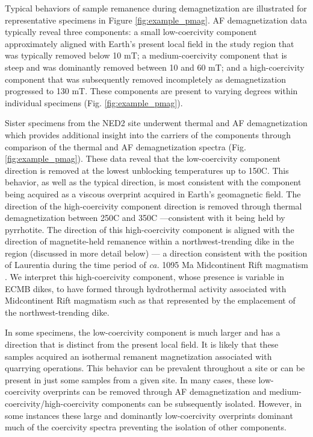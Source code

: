 \documentclass[draft]{agujournal2019}
\begin{document}
Typical behaviors of sample remanence during demagnetization are illustrated for representative specimens in Figure \ref{fig:example_pmag}. AF demagnetization data typically reveal three components: a small low-coercivity component approximately aligned with Earth's present local field in the study region that was typically removed below 10 mT; a medium-coercivity component that is steep and was dominantly removed between 10 and 60 mT; and a high-coercivity component that was subsequently removed incompletely as demagnetization progressed to 130 mT. These components are present to varying degrees within individual specimens (Fig. \ref{fig:example_pmag}).

Sister specimens from the NED2 site underwent thermal and AF demagnetization which provides additional insight into the carriers of the components through comparison of the thermal and AF demagnetization spectra (Fig. \ref{fig:example_pmag}). These data reveal that the low-coercivity component direction is removed at the lowest unblocking temperatures up to 150\textdegree C. This behavior, as well as the typical direction, is most consistent with the component being acquired as a viscous overprint acquired in Earth's geomagnetic field. The direction of the high-coercivity component direction is removed through thermal demagnetization between 250\textdegree C and 350\textdegree C ---consistent with it being held by pyrrhotite. The direction of this high-coercivity component is aligned with the direction of magnetite-held remanence within a northwest-trending dike in the region (discussed in more detail below) --- a direction consistent with the position of Laurentia during the time period of \textit{ca.} 1095 Ma Midcontinent Rift magmatism \cite{Swanson-Hysell2020a}. We interpret this high-coercivity component, whose presence is variable in ECMB dikes, to have formed through hydrothermal activity associated with Midcontinent Rift magmatism such as that represented by the emplacement of the northwest-trending dike.  

In some specimens, the low-coercivity component is much larger and has a direction that is distinct from the present local field. It is likely that these samples acquired an isothermal remanent magnetization associated with quarrying operations. This behavior can be prevalent throughout a site or can be present in just some samples from a given site. In many cases, these low-coercivity overprints can be removed through AF demagnetization and medium-coercivity/high-coercivity components can be subsequently isolated. However, in some instances these large and dominantly low-coercivity overprints dominant much of the coercivity spectra preventing the isolation of other components.
\end{document}
